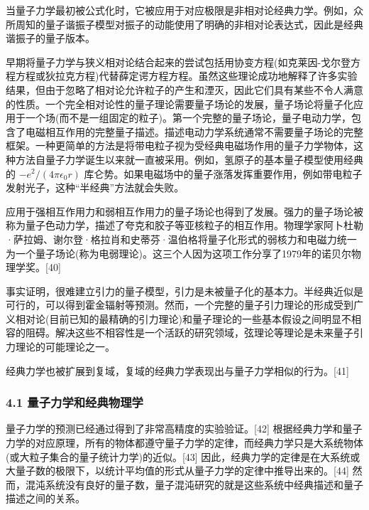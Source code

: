当量子力学最初被公式化时，它被应用于对应极限是非相对论经典力学。例如，众所周知的量子谐振子模型对振子的动能使用了明确的非相对论表达式，因此是经典谐振子的量子版本。

早期将量子力学与狭义相对论结合起来的尝试包括用协变方程(如克莱因-戈尔登方程方程或狄拉克方程)代替薛定谔方程方程。虽然这些理论成功地解释了许多实验结果，但由于忽略了相对论允许粒子的产生和湮灭，因此它们具有某些不令人满意的性质。一个完全相对论性的量子理论需要量子场论的发展，量子场论将量子化应用于一个场(而不是一组固定的粒子)。第一个完整的量子场论，量子电动力学，包含了电磁相互作用的完整量子描述。描述电动力学系统通常不需要量子场论的完整框架。一种更简单的方法是将带电粒子视为受经典电磁场作用的量子力学物体，这种方法自量子力学诞生以来就一直被采用。例如，氢原子的基本量子模型使用经典的 $-{e^2}/(4 \pi \epsilon_{0} r)$
  库仑势。如果电磁场中的量子涨落发挥重要作用，例如带电粒子发射光子，这种“半经典”方法就会失败。

应用于强相互作用力和弱相互作用力的量子场论也得到了发展。强力的量子场论被称为量子色动力学，描述了夸克和胶子等亚核粒子的相互作用。物理学家阿卜杜勒·萨拉姆、谢尔登·格拉肖和史蒂芬·温伯格将量子化形式的弱核力和电磁力统一为一个量子场论(称为电弱理论)。这三个人因为这项工作分享了1979年的诺贝尔物理学奖。[40]

事实证明，很难建立引力的量子模型，引力是未被量子化的基本力。半经典近似是可行的，可以得到霍金辐射等预测。然而，一个完整的量子引力理论的形成受到广义相对论(目前已知的最精确的引力理论)和量子理论的一些基本假设之间明显不相容的阻碍。解决这些不相容性是一个活跃的研究领域，弦理论等理论是未来量子引力理论的可能理论之一。

经典力学也被扩展到复域，复域的经典力学表现出与量子力学相似的行为。[41]

\subsubsection{4.1 量子力学和经典物理学}
量子力学的预测已经通过得到了非常高精度的实验验证。[42] 根据经典力学和量子力学的对应原理，所有的物体都遵守量子力学的定律，而经典力学只是大系统物体(或大粒子集合的量子统计力学)的近似。[43] 因此，经典力学的定律是在大系统或大量子数的极限下，以统计平均值的形式从量子力学的定律中推导出来的。[44] 然而，混沌系统没有良好的量子数，量子混沌研究的就是这些系统中经典描述和量子描述之间的关系。

